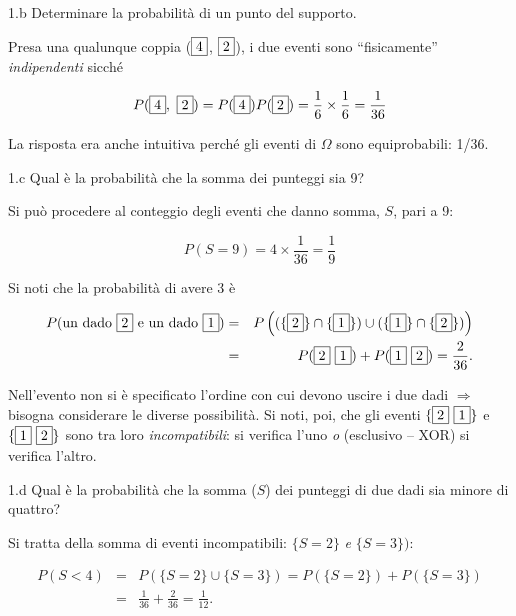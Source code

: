 \documentclass[
  11pt,
]{book}
\theoremstyle{mytheoremstyle}
\theoremstyle{mydefstyle}
\newenvironment{sol}
  {
  \begin{tcolorbox}[enhanced,breakable,arc=0.1mm,boxrule=1pt,colback=white,colframe=iblue,
  title=\bf \fontfamily{lmss}\selectfont \hspace{.5 cm} Soluzione,drop fuzzy shadow]

}{
\end{tcolorbox}
  }
\begin{document}
1.b Determinare la probabilità di un
punto del supporto.

\begin{sol}
Presa una qualunque coppia (\(\fbox{4}\), \(\fbox{2}\)),
i due eventi sono ``fisicamente'' \emph{indipendenti} sicché

\[
    P(\fbox{4}  ,\ \fbox{2})
= P(\fbox{4}) P(\fbox{2}) = \frac{1} {6}  \times  \frac{1} {6}
= \frac{1} {36}
\]

La risposta era anche intuitiva perché gli eventi di \(\Omega\)
sono equiprobabili: 1/36.

\end{sol}

1.c Qual è la probabilità che la somma dei punteggi sia 9?

\begin{sol}
Si può procedere al conteggio degli eventi che danno somma, \(S\), pari a 9:

\[
P(S=9) = 4  \times  \frac{1} {36} = \frac{1} {9}
\]

Si noti che la probabilità di avere 3 è

\begin{eqnarray*}
    P(\text{un dado $\fbox{2}$ e un dado $\fbox{1}$})
&=& P\left( (\lbrace \fbox{2}\rbrace \cap \lbrace \fbox{1}\rbrace) \cup
            (\lbrace \fbox{1}\rbrace \cap \lbrace \fbox{2}\rbrace)
    \right) \\
&=& P(\fbox{2}\ \fbox{1}) + P(\fbox{1}\ \fbox{2}) = \frac{2} {36}   .
\end{eqnarray*}

Nell'evento non si è specificato l'ordine con cui devono uscire
i due dadi \(\Rightarrow\) bisogna considerare le diverse possibilità.
Si noti, poi, che gli eventi \(\{\fbox{2}\ \fbox{1}\}\) e
\(\{\fbox{1}\ \fbox{2}\}\) sono tra loro \emph{incompatibili}:
si verifica l'uno \emph{o} (esclusivo -- XOR) si verifica l'altro.

\end{sol}

1.d Qual è la probabilità che la somma (\(S\))
dei punteggi di due dadi sia minore di quattro?

\begin{sol}
Si tratta della somma di eventi incompatibili: \(\{S=2\}\) \emph{e} \(\{ S=3 \})\):

\begin{eqnarray*}
P(S<4) &=& P(\{S=2\} \cup \{ S=3 \})
        =  P(\{S=2\}) + P(\{ S=3 \}) \\
       &=& \frac{1} {36} + \frac{2} {36} = \frac{1} {12}   .
\end{eqnarray*}

\end{sol}
\end{document}
